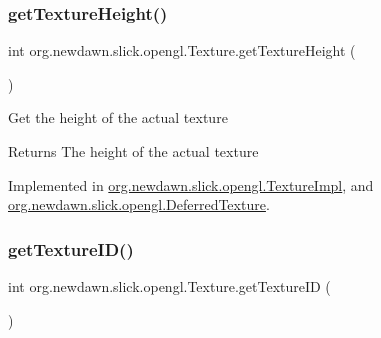 \mbox{\label{interfaceorg_1_1newdawn_1_1slick_1_1opengl_1_1_texture_a6626d0905e80214b320fb0042ad0e98d}} 
\subsubsection{\texorpdfstring{get\+Texture\+Height()}{getTextureHeight()}}
{\footnotesize\ttfamily int org.\+newdawn.\+slick.\+opengl.\+Texture.\+get\+Texture\+Height (\begin{DoxyParamCaption}{ }\end{DoxyParamCaption})}

Get the height of the actual texture

\begin{DoxyReturn}{Returns}
The height of the actual texture 
\end{DoxyReturn}


Implemented in \mbox{\hyperlink{classorg_1_1newdawn_1_1slick_1_1opengl_1_1_texture_impl_ad3ab4017a31fb25922ee51990acb2231}{org.\+newdawn.\+slick.\+opengl.\+Texture\+Impl}}, and \mbox{\hyperlink{classorg_1_1newdawn_1_1slick_1_1opengl_1_1_deferred_texture_a71d22424b36651006e822d715c97ea73}{org.\+newdawn.\+slick.\+opengl.\+Deferred\+Texture}}.

\mbox{\label{interfaceorg_1_1newdawn_1_1slick_1_1opengl_1_1_texture_a0d846c1cfcc66768db002d4eb06ad841}} 
\subsubsection{\texorpdfstring{get\+Texture\+I\+D()}{getTextureID()}}
{\footnotesize\ttfamily int org.\+newdawn.\+slick.\+opengl.\+Texture.\+get\+Texture\+ID (\begin{DoxyParamCaption}{ }\end{DoxyParamCaption})}

